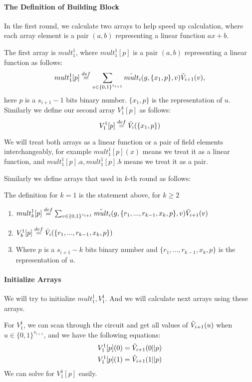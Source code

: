 {	\paragraph{The Definition of Building Block}
	In the first round, we calculate two arrays to help speed up calculation, where each array element is a pair $(a, b)$ representing a linear function $ax+b$.
	
	The first array is $mult_1^1$, where $mult_1^1[p]$ is a pair $(a, b)$ representing a linear function as follows:
	$${mult}_1^1[p]\overset{def}{=}\sum_{v\in \{0,1\}^{s_{i+1}}}\tilde{mult}_i(g, \{x_1, p\}, v)\tilde{V}_{i+1}(v),$$
	here $p$ is a $s_{i+1}-1$ bits binary number. $\{x_1, p\}$ is the representation of $u$. Similarly we define our second array ${V}_1^1[p]$ as follows:
	$$V_1^1[p]\overset{def}{=}\tilde{V}_i(\{x_1, p\})$$
	
	We will treat both arrays as a linear function or a pair of field elements interchangeably, for example ${mult}_1^1[p](x)$ means we treat it as a linear function, and ${mult}_1^1[p].a, {mult}_1^1[p].b$ means we treat it as a pair.
	
	Similarly we define arrays that used in $k$-th round as follows:
	\begin{definition}
		
		The definition for $k=1$ is the statement above, for $k\ge 2$
		\begin{enumerate}
			\item ${mult}_k^1[p]\overset{def}{=}\sum_{v\in \{0, 1\}^{s_{i+1}}}\tilde{mult}_i(g, \{r_1, ..., r_{k-1}, x_k, p\}, v)\tilde{V}_{i+1}(v)$
			\item ${V}_k^1[p]\overset{def}{=}\tilde{V}_i(\{r_1, ..., r_{k-1}, x_k, p\})$
			\item Where $p$ is a $s_{i+1}-k$ bits binary number and $\{r_1, ..., r_{k-1}, x_k, p\}$ is the representation of $u$.
		\end{enumerate}
	\end{definition}
	
	\paragraph{Initialize Arrays}
	We will try to initialize ${mult}_1^1, {V}_1^1$. And we will calculate next arrays using these arrays.
	
	For ${V}_1^1$, we can scan through the circuit and get all values of $\tilde{V}_{i+1}(u)$ when $u \in \{0, 1\}^{s_{i+1}}$, and we have the following equations:
	\begin{align*}
	{V}_1^1[p](0)=\tilde{V}_{i+1}(0||p)\\
	{V}_1^1[p](1)=\tilde{V}_{i+1}(1||p)
	\end{align*}
	We can solve for ${V}_1^1[p]$ easily.
	
}
